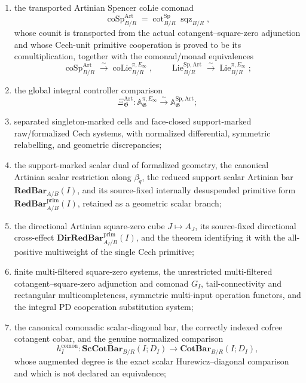 \begin{theorem}
\begin{enumerate}
    \item the transported Artinian Spencer coLie comonad
    \[
        \operatorname{coSp}_{B/R}^{\mathrm{Art}}
        =
        \operatorname{cot}^{\mathrm{Sp}}_{B/R}
        \operatorname{sqz}_{B/R},
    \]
    whose counit is transported from the actual cotangent--square-zero
    adjunction and whose Cech-unit primitive cooperation is proved to be its
    comultiplication, together with the comonad/monad equivalences
    \[
        \operatorname{coSp}_{B/R}^{\mathrm{Art}}
        \xrightarrow{\sim}
        \operatorname{coLie}_{B/R}^{\pi,E_\infty},
        \qquad
        \operatorname{Lie}^{\mathrm{Sp,Art}}_{B/R}
        \xrightarrow{\sim}
        \operatorname{Lie}^{\pi,E_\infty}_{B/R};
    \]

    \item the global integral controller comparison
    \[
    \boxed{
        \Xi_{\mathfrak G}^{\mathrm{Art}}:
        \mathbb A_{\mathfrak G}^{\pi,E_\infty}
        \xrightarrow{\sim}
        \mathbb A_{\mathfrak G}^{\mathrm{Sp,Art}};
    }
    \]

    \item separated singleton-marked cells and face-closed support-marked
    raw/formalized Cech systems, with normalized differential, symmetric
    relabelling, and geometric discrepancies;

    \item the support-marked scalar dual of formalized geometry, the canonical
    Artinian scalar restriction along
    $\beta_{\widetilde q}$, the reduced support scalar Artinian bar
    $\mathbf{RedBar}_{A/B}(I)$, and its source-fixed internally desuspended
    primitive form $\mathbf{RedBar}^{\mathrm{prim}}_{A/B}(I)$, retained as a
    geometric scalar branch;

    \item the directional Artinian square-zero cube $J\mapsto A_J$, its
    source-fixed directional cross-effect
    $\mathbf{DirRedBar}^{\mathrm{prim}}_{A_I/B}(I)$, and the theorem
    identifying it with the all-positive multiweight of the single Cech
    primitive;

    \item finite multi-filtered square-zero systems, the unrestricted
    multi-filtered cotangent--square-zero adjunction and comonad $G_I$,
    tail-connectivity and rectangular multicompleteness, symmetric multi-input
    operation functors, and the integral PD cooperation substitution system;

    \item the canonical comonadic scalar-diagonal bar, the correctly indexed
    cofree cotangent cobar, and the genuine normalized comparison
    \[
        h_I^{\mathrm{comon}}:
        \mathbf{ScCotBar}_{B/R}(I;D_I)
        \longrightarrow
        \mathbf{CotBar}_{B/R}(I;D_I),
    \]
    whose augmented degree is the exact scalar Hurewicz--diagonal comparison
    and which is not declared an equivalence;


\end{enumerate}
\end{theorem}
